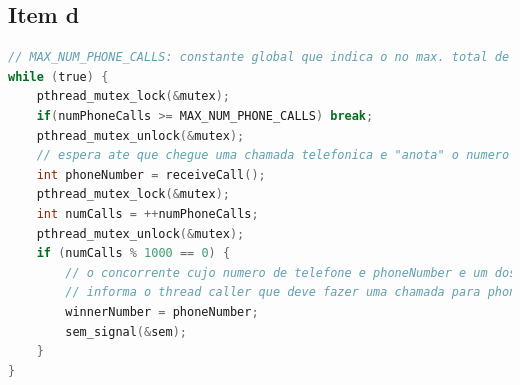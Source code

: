 {\subsection{Item d}
\begin{lstlisting}[language=C,basicstyle=\small]
// MAX_NUM_PHONE_CALLS: constante global que indica o no max. total de chamadas
while (true) {
    pthread_mutex_lock(&mutex);
    if(numPhoneCalls >= MAX_NUM_PHONE_CALLS) break;
    pthread_mutex_unlock(&mutex);
    // espera ate que chegue uma chamada telefonica e "anota" o numero de telefone
    int phoneNumber = receiveCall();
    pthread_mutex_lock(&mutex);
    int numCalls = ++numPhoneCalls;
    pthread_mutex_unlock(&mutex);
    if (numCalls % 1000 == 0) {
        // o concorrente cujo numero de telefone e phoneNumber e um dos vencedores
        // informa o thread caller que deve fazer uma chamada para phoneNumber
        winnerNumber = phoneNumber;
        sem_signal(&sem);
    }
}
\end{lstlisting}
        
}
